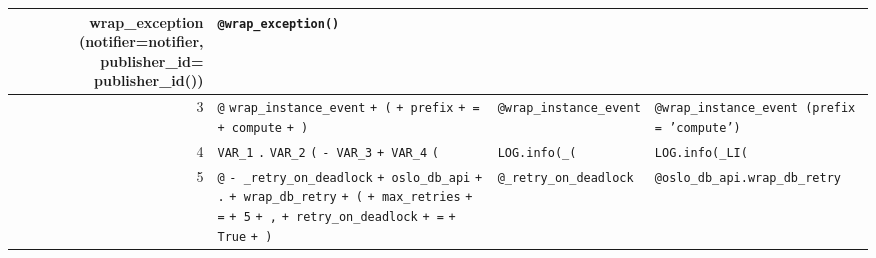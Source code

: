 \documentclass[11pt]{jreport}
\begin{document}
\begin{table}[t]
\begin{tabular}{r|p{5cm}|p{4.5cm}|p{4.5cm}}
{        wrap\_exception
        \newline
        (notifier=notifier, publisher\_id=
        \newline
        publisher\_id())}
        &
        \texttt{@wrap\_exception()}\\
        \hline
        3 &
        \colorbox{lightgray!50}{\texttt{@}} \colorbox{lightgray!50}{\texttt{wrap\_instance\_event}} 
        \newline
        \colorbox{lightgray!50}{\texttt{+ (}} \colorbox{lightgray!50}{\texttt{+ prefix}} \colorbox{lightgray!50}{\texttt{+ =}} 
        \newline
        \colorbox{lightgray!50}{\texttt{+ compute}} \colorbox{lightgray!50}{\texttt{+ )}}
        &
        \texttt{@wrap\_instance\_event}
        &
        \texttt{@wrap\_instance\_event\newline
        (prefix = 'compute')}\\
        \hline
        4 &
        \colorbox{lightgray!50}{\texttt{VAR\_1}} \colorbox{lightgray!50}{\texttt{.}} \colorbox{lightgray!50}{\texttt{VAR\_2}} \colorbox{lightgray!50}{\texttt{(}}
        \newline
        \colorbox{lightgray!50}{\texttt{- VAR\_3}} \colorbox{lightgray!50}{\texttt{+ VAR\_4}}
        \colorbox{lightgray!50}{\texttt{(}}
        &
        \texttt{LOG.info(\_(}
        &
        \texttt{LOG.info(\_LI(}\\
        \hline
        5 &
        \colorbox{lightgray!50}{\texttt{@}} \colorbox{lightgray!50}{\texttt{- \_retry\_on\_deadlock}} 
        \newline
        \colorbox{lightgray!50}{\texttt{+ oslo\_db\_api}} \colorbox{lightgray!50}{\texttt{+ .}}
        \newline
        \colorbox{lightgray!50}{\texttt{+ wrap\_db\_retry}} \colorbox{lightgray!50}{\texttt{+ (}}
        \newline
        \colorbox{lightgray!50}{\texttt{+ max\_retries}} \colorbox{lightgray!50}{\texttt{+ =}} 
        \colorbox{lightgray!50}{\texttt{+ 5}} 
        \newline
        \colorbox{lightgray!50}{\texttt{+ ,}} \colorbox{lightgray!50}{\texttt{+ retry\_on\_deadlock}} 
        \newline
        \colorbox{lightgray!50}{\texttt{+ =}} \colorbox{lightgray!50}{\texttt{+ True}} \colorbox{lightgray!50}{\texttt{+ )}}
        &
        \texttt{@\_retry\_on\_deadlock}
        &
        \texttt{@oslo\_db\_api.wrap\_db\_retry
        \newline
}
\end{tabular}
\end{table}
\end{document}
